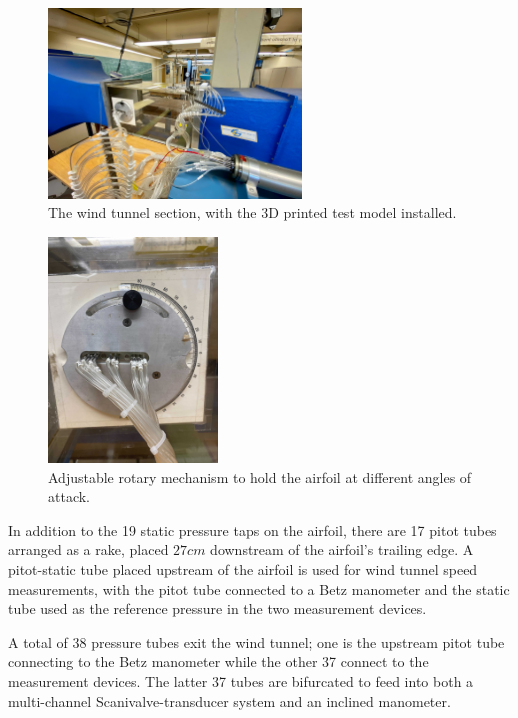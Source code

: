\documentclass[runningheads]{llncs}
\begin{document}
\begin{figure}
    \centering
    \includegraphics[width=0.6\textwidth]{Apparatus Pictures/wind_tunnel_setup.jpg}
    \caption{The wind tunnel section, with the 3D printed test model installed.}
    \label{fig:wind_tunnel_setup}
\end{figure}

\begin{figure}
    \centering
    \includegraphics[width=0.4\textwidth]{Apparatus Pictures/aoa_selector.jpg}
    \caption{Adjustable rotary mechanism to hold the airfoil at different angles of attack.}
    \label{fig:aoa_select}
\end{figure}

\noindent
In addition to the 19 static pressure taps on the airfoil, there are 17 pitot tubes arranged as a rake, placed $27\si{cm}$ downstream of the airfoil's trailing edge. A pitot-static tube placed upstream of the airfoil is used for wind tunnel speed measurements, with the pitot tube connected to a Betz manometer and the static tube used as the reference pressure in the two measurement devices.\newline

\noindent
A total of 38 pressure tubes exit the wind tunnel; one is the upstream pitot tube connecting to the Betz manometer while the other 37 connect to the measurement devices. The latter 37 tubes are bifurcated to feed into both a multi-channel Scanivalve-transducer system and an inclined manometer.\newline
\end{document}
